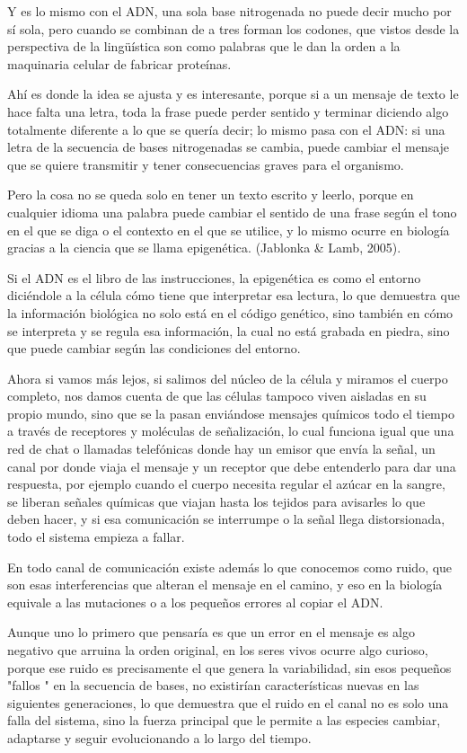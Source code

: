 \documentclass[12pt]{article}
\begin{document}
Y es lo mismo con el ADN, una sola base nitrogenada no puede decir mucho por sí sola, pero cuando se combinan de a tres forman los codones, que vistos desde la perspectiva de la lingüística son como palabras que le dan la orden a la maquinaria celular de fabricar proteínas.

Ahí es donde la idea se ajusta y es interesante, porque si a un mensaje de texto le hace falta una letra, toda la frase puede perder sentido y terminar diciendo algo totalmente diferente a lo que se quería decir; lo mismo pasa con el ADN: si una letra de la secuencia de bases nitrogenadas se cambia, puede cambiar el mensaje que se quiere transmitir y tener consecuencias graves para el organismo.

Pero la cosa no se queda solo en tener un texto escrito y leerlo, porque en cualquier idioma una palabra puede cambiar el sentido de una frase según el tono en el que se diga o el contexto en el que se utilice, y lo mismo ocurre en biología gracias a la ciencia que se llama epigenética. (Jablonka \& Lamb, 2005).

Si el ADN es el libro de las instrucciones, la epigenética es como el entorno diciéndole a la célula cómo tiene que interpretar esa lectura, lo que demuestra que la información biológica no solo está en el código genético, sino también en cómo se interpreta y se regula esa información, la cual no está grabada en piedra, sino que puede cambiar según las condiciones del entorno.

Ahora si vamos más lejos, si salimos del núcleo de la célula y miramos el cuerpo completo, nos damos cuenta de que las células tampoco viven aisladas en su propio mundo, sino que se la pasan enviándose mensajes químicos todo el tiempo a través de receptores y moléculas de señalización, lo cual funciona igual que una red de chat o llamadas telefónicas donde hay un emisor que envía la señal, un canal por donde viaja el mensaje y un receptor que debe entenderlo para dar una respuesta, por ejemplo cuando el cuerpo necesita regular el azúcar en la sangre, se liberan señales químicas que viajan hasta los tejidos para avisarles lo que deben hacer, y si esa comunicación se interrumpe o la señal llega distorsionada, todo el sistema empieza a fallar.

En todo canal de comunicación existe además lo que conocemos como ruido, que son esas interferencias que alteran el mensaje en el camino, y eso en la biología equivale a las mutaciones o a los pequeños errores al copiar el ADN.

Aunque uno lo primero que pensaría es que un error en el mensaje es algo negativo que arruina la orden original, en los seres vivos ocurre algo curioso, porque ese ruido es precisamente el que genera la variabilidad, sin esos pequeños "fallos " en la secuencia de bases, no existirían características nuevas en las siguientes generaciones, lo que demuestra que el ruido en el canal no es solo una falla del sistema, sino la fuerza principal que le permite a las especies cambiar, adaptarse y seguir evolucionando a lo largo del tiempo.
\end{document}
